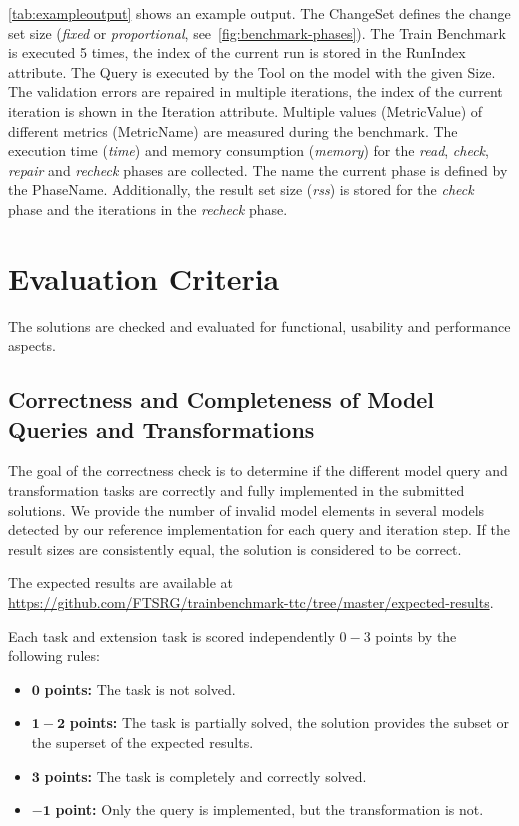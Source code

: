 \documentclass[submission,copyright,creativecommons]{eptcs}
\newcommand{\figref}[1]{\autoref{fig:#1}}
\begin{document}
\autoref{tab:exampleoutput} shows an example output. The \textsf{ChangeSet} defines the change set size (\emph{fixed} or \emph{proportional}, see~\figref{benchmark-phases}). The Train Benchmark is executed 5 times, the index of the current run is stored in the \textsf{RunIndex} attribute. The \textsf{Query} is executed by the \textsf{Tool} on the model with the given \textsf{Size}. The validation errors are repaired in multiple iterations, the index of the current iteration is shown in the \textsf{Iteration} attribute. Multiple values (\textsf{MetricValue}) of different metrics (\textsf{MetricName}) are measured during the benchmark. The execution time (\textit{time}) and memory consumption (\textit{memory}) for the \textit{read}, \textit{check}, \textit{repair} and \textit{recheck} phases are collected. The name the current phase is defined by the \textsf{PhaseName}. Additionally, the result set size (\textit{rss}) is stored for the \textit{check} phase and the iterations in the \textit{recheck} phase.


\section{Evaluation Criteria}

The solutions are checked and evaluated for functional, usability and performance aspects.

\subsection{Correctness and Completeness of Model Queries and Transformations}
The goal of the correctness check is to determine if the different model query and transformation tasks are correctly and fully implemented in the submitted solutions.
We provide the number of invalid model elements in several models detected by our reference implementation for each query and iteration step. If the result sizes are consistently equal, the solution is considered to be correct.

The expected results are available at \url{https://github.com/FTSRG/trainbenchmark-ttc/tree/master/expected-results}.

Each task and extension task is scored independently $0-3$ points by the following rules:
\begin{itemize}
	\item $\mathbf{0}$   \textbf{points:} The task is not solved.
	\item $\mathbf{1-2}$ \textbf{points:} The task is partially solved, the solution provides the subset or the superset of the expected results.
	\item $\mathbf{3}$   \textbf{points:} The task is completely and correctly solved.
	\item $\mathbf{-1}$  \textbf{point:} Only the query is implemented, but the transformation is not.
\end{itemize}
\end{document}

